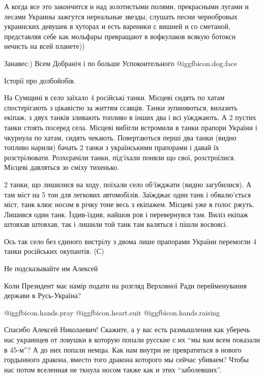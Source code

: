 \begin{itemize}

А когда все это закончится и над золотистыми полями, прекрасными лугами и
лесами Украины зажгутся нереальные звезды, слушать песни чернобровых украинских
девушек в хуторах и есть вареники с вишней и со сметаной, представляя себе как
мольфары превращают в вофкулаков всякую ботоксн нечисть на всей планете))

Занавес:) Всем Добраніч і по больше Успокоительного  @igg{fbicon.dog.face} 


Історії про долбойобів.

На Сумщині в село заїхало 4 російські танки. Місцеві сидять по хатам
спостерігають з цікавістю за життям ссавців. Танки зупиняються, вилазить
екіпаж, з двух танків зливають топливо в інших два і всі уїжджають. А 2 пустих
танки стоять посеред села. Місцеві вибігли встромили в танки прапори України і
чкурнула по хатам, сидять чекають. Повертаються перші два танки (видно топливо
нарили) бачать 2 танки з українськими прапорами і давай їх розстрілювати.
Розхєрачіли танки, під‘їхали поняли що свої, розстроїлися. Місцеві давляться зо
сміху тихенько.

2 танки, що лишилися на ходу, поїхали село об‘їжджати (видно загубилися). А там
міст на 5 тон для легкових автомобілів. Заїжджає один танк і обвалю’ється міст,
танк клює носом в річку тоне весь з екіпажем. Місцеві уже в голос ржуть.
Лишився один танк. Їздив-їздив, найшов ров і перевернувся там. Виліз екіпаж
штовхав штовхав, так і лишили той танк там валяться і пішли восвоясі.

Ось так село без єдиного вистрілу з двома лише прапорами України перемогли 4
танки російських окупантів. (С)

Не подсказывайте им Алексей

Коли Президент має намір подати на розгляд Верховної Ради перейменування держави в Русь-Україна?

 @igg{fbicon.hands.pray} @igg{fbicon.heart.suit} @igg{fbicon.hands.raising} 


Спасибо Алексей Николаевич! Скажите, а у вас есть размышления как уберечь нас
украинцев от ловушки в которую попали русские с их \enquote{мы вам всем показали в
45-м}? А до них попали немцы. Как нам внутри не превратиться в нового
гордынного дракона, вместо того дракона которого мы сейчас убиваем? Чтобы нас
потом вселенная не ткнула носом также как и этих \enquote{заболевших}.


\end{itemize}
